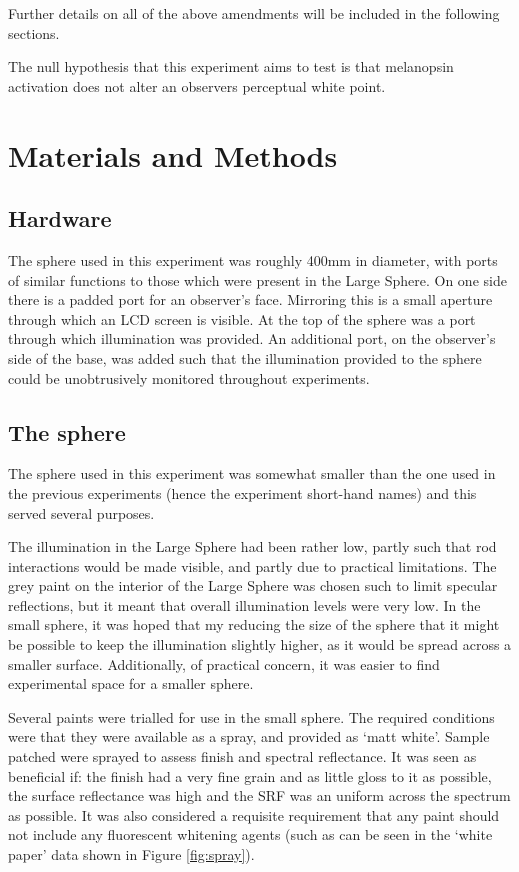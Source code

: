 Further details on all of the above amendments will be included in the following sections. 

The null hypothesis that this experiment aims to test is that melanopsin activation does not alter an observers perceptual white point.

\section{Materials and Methods}

\subsection{Hardware}

The sphere used in this experiment was roughly 400mm in diameter, with ports of similar functions to those which were present in the Large Sphere. On one side there is a padded port for an observer's face. Mirroring this is a small aperture through which an LCD screen is visible. At the top of the sphere was a port through which illumination was provided. An additional port, on the observer's side of the base, was added such that the illumination provided to the sphere could be unobtrusively monitored throughout experiments.

\subsection{The sphere}

The sphere used in this experiment was somewhat smaller than the one used in the previous experiments (hence the experiment short-hand names) and this served several purposes. 

The illumination in the Large Sphere had been rather low, partly such that rod interactions would be made visible, and partly due to practical limitations. The grey paint on the interior of the Large Sphere was chosen such to limit specular reflections, but it meant that overall illumination levels were very low. In the small sphere, it was hoped that my reducing the size of the sphere that it might be possible to keep the illumination slightly higher, as it would be spread across a smaller surface. Additionally, of practical concern, it was easier to find experimental space for a smaller sphere.

Several paints were trialled for use in the small sphere. The required conditions were that they were available as a spray, and provided as `matt white'. Sample patched were sprayed to assess finish and spectral reflectance. It was seen as beneficial if: the finish had a very fine grain and as little gloss to it as possible, the surface reflectance was high and the \gls{SRF} was an uniform across the spectrum as possible. It was also considered a requisite requirement that any paint should not include any fluorescent whitening agents (such as can be seen in the `white paper' data shown in Figure \ref{fig:spray}).

